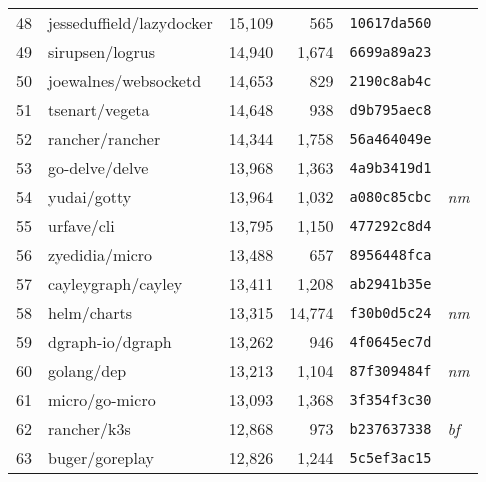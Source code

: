 {\begin{supertabular}{llrrll}
        48  &           jesseduffield/lazydocker & 15,109 &    565 &  \texttt{10617da560} &              \\
        49  &                    sirupsen/logrus & 14,940 &  1,674 &  \texttt{6699a89a23} &              \\
        50  &               joewalnes/websocketd & 14,653 &    829 &  \texttt{2190c8ab4c} &              \\
        51  &                     tsenart/vegeta & 14,648 &    938 &  \texttt{d9b795aec8} &              \\
        52  &                    rancher/rancher & 14,344 &  1,758 &  \texttt{56a464049e} &              \\
        53  &                     go-delve/delve & 13,968 &  1,363 &  \texttt{4a9b3419d1} &              \\
        54  &                        yudai/gotty & 13,964 &  1,032 &  \texttt{a080c85cbc} &  \textit{nm} \\
        55  &                         urfave/cli & 13,795 &  1,150 &  \texttt{477292c8d4} &              \\
        56  &                     zyedidia/micro & 13,488 &    657 &  \texttt{8956448fca} &              \\
        57  &                 cayleygraph/cayley & 13,411 &  1,208 &  \texttt{ab2941b35e} &              \\
        58  &                        helm/charts & 13,315 & 14,774 &  \texttt{f30b0d5c24} &  \textit{nm} \\
        59  &                   dgraph-io/dgraph & 13,262 &    946 &  \texttt{4f0645ec7d} &              \\
        60  &                         golang/dep & 13,213 &  1,104 &  \texttt{87f309484f} &  \textit{nm} \\
        61  &                     micro/go-micro & 13,093 &  1,368 &  \texttt{3f354f3c30} &              \\
        62  &                        rancher/k3s & 12,868 &    973 &  \texttt{b237637338} &  \textit{bf} \\
        63  &                     buger/goreplay & 12,826 &  1,244 &  \texttt{5c5ef3ac15} &              \\

\end{supertabular}}
